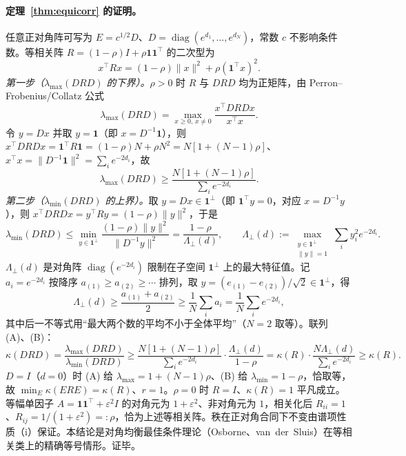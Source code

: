 \documentclass[fontset=windows,11pt]{ctexart}
\DeclareMathOperator{\diag}{diag}
\numberwithin{equation}{section}
\begin{document}
\paragraph{定理~\ref{thm:equicorr} 的证明。}
任意正对角阵可写为 $E=c^{1/2}D$、$D=\diag(e^{d_1},\dots,e^{d_N})$，常数 $c$ 不影响条件数。等相关阵 $R=(1-\rho)I+\rho\mathbf 1\mathbf 1^\top$ 的二次型为
\[
x^\top R x=(1-\rho)\|x\|^2+\rho(\mathbf 1^\top x)^2.
\]
\emph{第一步（$\lambda_{\max}(DRD)$ 的下界）。}$\rho>0$ 时 $R$ 与 $DRD$ 均为正矩阵，由 Perron--Frobenius/Collatz 公式
\[
\lambda_{\max}(DRD)=\max_{x\ge0,\,x\ne0}\frac{x^\top DRD x}{x^\top x}.
\]
令 $y=Dx$ 并取 $y=\mathbf 1$（即 $x=D^{-1}\mathbf 1$），则 $x^\top DRD x=\mathbf 1^\top R\mathbf 1=(1-\rho)N+\rho N^2=N[1+(N-1)\rho]$、$x^\top x=\|D^{-1}\mathbf 1\|^2=\sum_i e^{-2d_i}$，故
\[
\lambda_{\max}(DRD)\ge\frac{N[1+(N-1)\rho]}{\sum_i e^{-2d_i}}. \tag{A}
\]
\emph{第二步（$\lambda_{\min}(DRD)$ 的上界）。}取 $y=Dx\in\mathbf 1^\perp$（即 $\mathbf 1^\top y=0$，对应 $x=D^{-1}y$），则 $x^\top DRD x=y^\top R y=(1-\rho)\|y\|^2$，于是
\[
\lambda_{\min}(DRD)\le\min_{y\in\mathbf 1^\perp}\frac{(1-\rho)\|y\|^2}{\|D^{-1}y\|^2}
=\frac{1-\rho}{\Lambda_\perp(d)},\qquad
\Lambda_\perp(d):=\max_{\substack{y\in\mathbf 1^\perp\\ \|y\|=1}}\sum_i y_i^2 e^{-2d_i}. \tag{B}
\]
$\Lambda_\perp(d)$ 是对角阵 $\diag(e^{-2d_i})$ 限制在子空间 $\mathbf 1^\perp$ 上的最大特征值。记 $a_i=e^{-2d_i}$ 按降序 $a_{(1)}\ge a_{(2)}\ge\cdots$ 排列，取 $y=(e_{(1)}-e_{(2)})/\sqrt2\in\mathbf 1^\perp$，得
\[
\Lambda_\perp(d)\ge\frac{a_{(1)}+a_{(2)}}2\ge\frac1N\sum_i a_i=\frac1N\sum_i e^{-2d_i},
\]
其中后一不等式用“最大两个数的平均不小于全体平均”（$N=2$ 取等）。联列 (A)、(B)：
\[
\kappa(DRD)=\frac{\lambda_{\max}(DRD)}{\lambda_{\min}(DRD)}
\ge\frac{N[1+(N-1)\rho]}{\sum_i e^{-2d_i}}\cdot\frac{\Lambda_\perp(d)}{1-\rho}
=\kappa(R)\cdot\frac{N\Lambda_\perp(d)}{\sum_i e^{-2d_i}}\ge\kappa(R).
\]
$D=I$（$d=0$）时 (A) 给 $\lambda_{\max}=1+(N-1)\rho$、(B) 给 $\lambda_{\min}=1-\rho$，恰取等，故 $\min_E\kappa(ERE)=\kappa(R)$、$r=1$。$\rho=0$ 时 $R=I$、$\kappa(R)=1$ 平凡成立。等幅单因子 $A=\mathbf 1\mathbf 1^\top+\varepsilon^2 I$ 的对角元为 $1+\varepsilon^2$、非对角元为 $1$，相关化后 $R_{ii}=1$、$R_{ij}=1/(1+\varepsilon^2)=:\rho$，恰为上述等相关阵。秩在正对角合同下不变由谱项性质（i）保证。本结论是对角均衡最佳条件理论（Osborne\cite{Osborne1960}、van~der~Sluis\cite{vanderSluis1969}）在等相关类上的精确等号情形。证毕。
\end{document}
